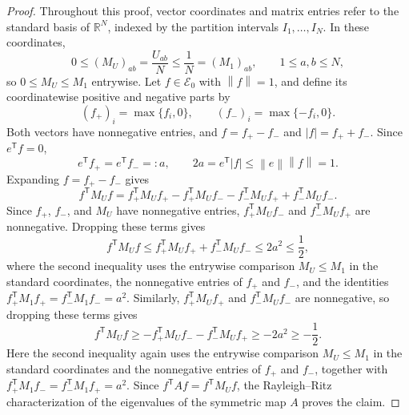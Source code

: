 \documentclass[11pt]{article}
\numberwithin{equation}{section}
\newcommand{\R}{\mathbb R}
\newcommand{\norm}[1]{\left\lVert #1\right\rVert}
\begin{document}
\begin{proof}
  Throughout this proof, vector coordinates and matrix entries refer to the standard basis of $\R^N$, indexed by the partition intervals $I_1,\ldots,I_N$.
  In these coordinates,
  \[
    0\le (M_U)_{ab}=\frac{U_{ab}}{N}\le\frac1N=(M_1)_{ab},
    \qquad 1\le a,b\le N,
  \]
  so $0\le M_U\le M_1$ entrywise.
  Let $f\in\mathcal E_0$ with $\norm f=1$, and define its coordinatewise
  positive and negative parts by
  \[
    (f_+)_i=\max\{f_i,0\},
    \qquad
    (f_-)_i=\max\{-f_i,0\}.
  \]
  Both vectors have nonnegative entries, and $f=f_+-f_-$ and $|f|=f_++f_-$.
  Since $e^{\mathsf T}f=0$,
  \[
    e^{\mathsf T}f_+=e^{\mathsf T}f_-=:a,
    \qquad
    2a=e^{\mathsf T}|f|\le\norm e\norm f=1.
  \]
  Expanding $f=f_+-f_-$ gives
  \[
    f^{\mathsf T}M_Uf
    =f_+^{\mathsf T}M_Uf_+
     -f_+^{\mathsf T}M_Uf_-
     -f_-^{\mathsf T}M_Uf_+
     +f_-^{\mathsf T}M_Uf_-.
  \]
  Since $f_+$, $f_-$, and $M_U$ have nonnegative entries,
  $f_+^{\mathsf T}M_Uf_-$ and $f_-^{\mathsf T}M_Uf_+$ are nonnegative.
  Dropping these terms gives
  \[
    f^{\mathsf T}M_Uf
    \le f_+^{\mathsf T}M_Uf_++f_-^{\mathsf T}M_Uf_-
      \le2a^2\le\frac12,
  \]
  where the second inequality uses the entrywise comparison $M_U\le M_1$
  in the standard coordinates, the nonnegative entries of $f_+$ and $f_-$,
  and the identities $f_+^{\mathsf T}M_1f_+=f_-^{\mathsf T}M_1f_-=a^2$.  Similarly,
  $f_+^{\mathsf T}M_Uf_+$ and $f_-^{\mathsf T}M_Uf_-$ are nonnegative,
  so dropping these terms gives
  \[
    f^{\mathsf T}M_Uf
    \ge-f_+^{\mathsf T}M_Uf_--f_-^{\mathsf T}M_Uf_+
      \ge-2a^2\ge-\frac12.
  \]
  Here the second inequality again uses the entrywise comparison $M_U\le M_1$
  in the standard coordinates and the nonnegative entries of $f_+$ and $f_-$,
  together with $f_+^{\mathsf T}M_1f_-=f_-^{\mathsf T}M_1f_+=a^2$.
  Since $f^{\mathsf T}Af=f^{\mathsf T}M_Uf$, the Rayleigh--Ritz
  characterization of the eigenvalues of the symmetric map $A$ proves the
  claim.
\end{proof}
\end{document}
